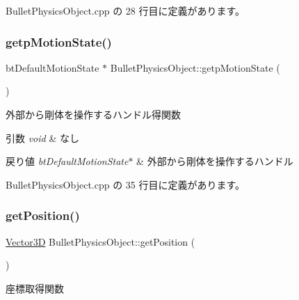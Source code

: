  Bullet\+Physics\+Object.\+cpp の 28 行目に定義があります。

\mbox{\label{class_bullet_physics_object_a92b00adf82adf916a8b6c3e8c7570926}} 
\subsubsection{\texorpdfstring{getp\+Motion\+State()}{getpMotionState()}}
{\footnotesize\ttfamily bt\+Default\+Motion\+State $\ast$ Bullet\+Physics\+Object\+::getp\+Motion\+State (\begin{DoxyParamCaption}{ }\end{DoxyParamCaption})}



外部から剛体を操作するハンドル得関数 


\begin{DoxyParams}{引数}
{\em void} & なし \\
\hline
\end{DoxyParams}

\begin{DoxyRetVals}{戻り値}
{\em bt\+Default\+Motion\+State$\ast$} & 外部から剛体を操作するハンドル \\
\hline
\end{DoxyRetVals}


 Bullet\+Physics\+Object.\+cpp の 35 行目に定義があります。

\mbox{\label{class_bullet_physics_object_a02e592eaa6470b7df077ae1f58db9323}} 
\subsubsection{\texorpdfstring{get\+Position()}{getPosition()}}
{\footnotesize\ttfamily \mbox{\hyperlink{class_vector3_d}{Vector3D}} Bullet\+Physics\+Object\+::get\+Position (\begin{DoxyParamCaption}{ }\end{DoxyParamCaption})}



座標取得関数 


